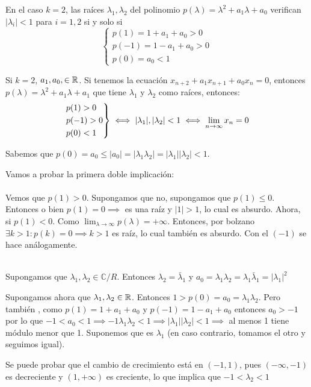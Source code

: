        \begin{nth}[Comportamiento asintótico de las soluciones con k=2]
        En el caso $k = 2$, las raíces $\lambda_{1}, \lambda_{2}$ del polinomio
        $p(\lambda) = \lambda^2 + a_{1}\lambda + a_{0}$ verifican $|\lambda_{i}|
        < 1$ para $i = 1, 2$ si y solo si
        $$
        \begin{cases}
          p(1) = 1 + a_{1} + a_{0} > 0 \\
          p(-1) = 1 - a_{1} + a_{0} > 0 \\
          p(0) = a_{0} < 1
        \end{cases}
        $$
      \end{nth}

\begin{nota}
	Si $k=2$, $a_1,a_0 ,\in \mathbb{R}$. Si tenemos la ecuación $x_{n+2} + a_1 x _{n+1}	+ a_0 x_n =0$, entonces $p(\lambda) = \lambda^2 + a_1 \lambda + a_1$ que tiene $\lambda_1 $ y $\lambda_2$ como raíces, entonces:
	\[
	\begin{rcases}
	p(1) > 0\\
	p(-1) > 0\\
	p(0) < 1
\end{rcases} \iff |\lambda_1|,|\lambda_2| < 1 \iff \lim_{n\to \infty } x_n  = 0
	\]

	Sabemos que $p(0) = a_0 \leq |a_0| = |\lambda_1 \lambda_2| = |\lambda_1||\lambda_2| < 1$.

	Vamos a probar la primera doble implicación:\\
	\boxed{\Rightarrow}\hfill \\
	Vemos que $p(1)> 0$. Supongamos que no, supongamos que $p(1) \leq 0$. Entonces o bien $p(1) = 0\implies $ es una raíz y $|1|>1$, lo cual es absurdo. Ahora, si $p(1) < 0$. Como $\lim_{\lambda \to \infty} p(\lambda) = + \infty$. Entonces, por bolzano $\exists k > 1 : p(k) = 0 \implies k > 1$ es raíz, lo cual también es absurdo. Con el $(-1)$ se hace análogamente.

	\boxed{\Leftarrow}\hfill \\
	Supongamos que $\lambda_1, \lambda_2 \in \mathbb C\slash R$. Entonces $\lambda_2 = \bar \lambda_1$ y $a_0 = \lambda_1 \lambda_2 = \lambda_1 \bar \lambda_1 = |\lambda_1|^2$

	Supongamos ahora que $\lambda_1,\lambda_2 \in \mathbb{R}$. Entonces $1 > p(0) = a_0 = \lambda_1 \lambda_2$. Pero también , como $p(1) = 1+a_1+a_0$ y $p(-1) = 1-a_1+a_0$ entonces $a_0 > -1$ por lo que $-1 < a_0 < 1\implies -1 \lambda_1 \lambda_2 < 1 \implies |\lambda_1||\lambda_2| < 1 \implies$ al menos 1 tiene módulo menor que 1. Suponemos que es $\lambda_1$ (en caso contrario, tomamos el otro y seguimos igual).

	Se puede probar que el cambio de crecimiento está en $(-1,1)$, pues $(-\infty,-1)$ es decreciente y $(1,+\infty)$ es creciente, lo que implica que $-1 < \lambda_2 < 1$
\end{nota}

